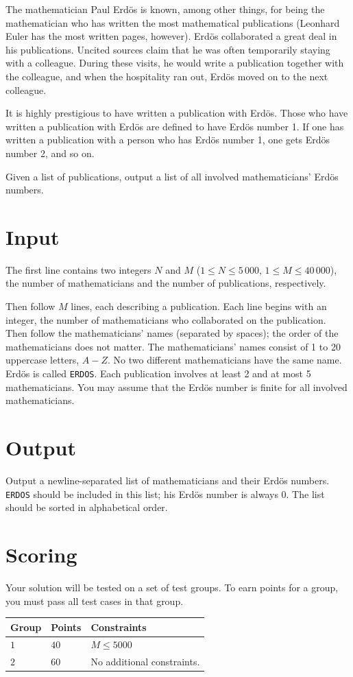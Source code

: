 
The mathematician Paul Erdös is known, among other things, for being the mathematician who has written the most mathematical publications (Leonhard Euler has the most written pages, however). Erdös collaborated a great deal in his publications. Uncited sources claim that he was often temporarily staying with a colleague. During these visits, he would write a publication together with the colleague, and when the hospitality ran out, Erdös moved on to the next colleague.

It is highly prestigious to have written a publication with Erdös. Those who have written a publication with Erdös are defined to have Erdös number 1. If one has written a publication with a person who has Erdös number 1, one gets Erdös number 2, and so on.

Given a list of publications, output a list of all involved mathematicians' Erdös numbers.

\section*{Input}
The first line contains two integers $N$ and $M$ ($1 \le N \le 5\,000$, $1 \le M \le 40\,000$), the number of mathematicians and the number of publications, respectively.

Then follow $M$ lines, each describing a publication. Each line begins with an integer, the number of mathematicians who collaborated on the publication. Then follow the mathematicians' names (separated by spaces); the order of the mathematicians does not matter. The mathematicians' names consist of 1 to 20 uppercase letters, $A - Z$. No two different mathematicians have the same name. Erdös is called \texttt{ERDOS}. Each publication involves at least 2 and at most 5 mathematicians. You may assume that the Erdös number is finite for all involved mathematicians.

\section*{Output}
Output a newline-separated list of mathematicians and their Erdös numbers. \texttt{ERDOS} should be included in this list; his Erdös number is always 0. The list should be sorted in alphabetical order.


\section*{Scoring}
Your solution will be tested on a set of test groups.
To earn points for a group, you must pass all test cases in that group.

\noindent
\begin{tabular}{| l | l | p{12cm} |}
  \hline
  \textbf{Group} & \textbf{Points} & \textbf{Constraints} \\ \hline
  $1$    & $40$          & $M \leq 5000$  \\ \hline
  $2$    & $60$          & No additional constraints.  \\ \hline
\end{tabular}
